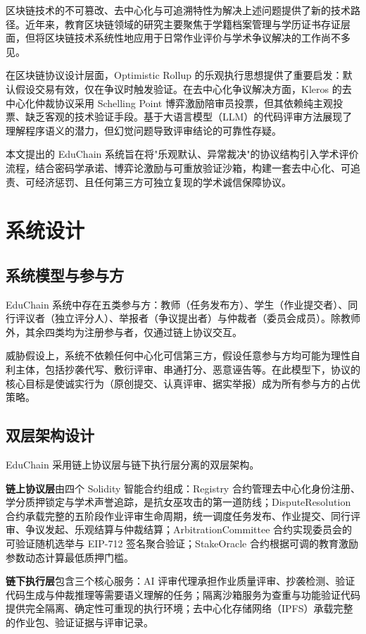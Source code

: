\documentclass[10pt,twocolumn]{ctexart}
\begin{document}
区块链技术的不可篡改、去中心化与可追溯特性为解决上述问题提供了新的技术路径。近年来，教育区块链领域的研究主要聚焦于学籍档案管理与学历证书存证层面，但将区块链技术系统性地应用于日常作业评价与学术争议解决的工作尚不多见。

在区块链协议设计层面，Optimistic Rollup 的乐观执行思想提供了重要启发：默认假设交易有效，仅在争议时触发验证。在去中心化争议解决方面，Kleros 的去中心化仲裁协议采用 Schelling Point 博弈激励陪审员投票，但其依赖纯主观投票、缺乏客观的技术验证手段。基于大语言模型（LLM）的代码评审方法展现了理解程序语义的潜力，但幻觉问题导致评审结论的可靠性存疑。

本文提出的 EduChain 系统旨在将"乐观默认、异常裁决"的协议结构引入学术评价流程，结合密码学承诺、博弈论激励与可重放验证沙箱，构建一套去中心化、可追责、可经济惩罚、且任何第三方可独立复现的学术诚信保障协议。

\section{系统设计}

\subsection{系统模型与参与方}

EduChain 系统中存在五类参与方：教师（任务发布方）、学生（作业提交者）、同行评议者（独立评分人）、举报者（争议提出者）与仲裁者（委员会成员）。除教师外，其余四类均为注册参与者，仅通过链上协议交互。

威胁假设上，系统不依赖任何中心化可信第三方，假设任意参与方均可能为理性自利主体，包括抄袭代写、敷衍评审、串通打分、恶意诬告等。在此模型下，协议的核心目标是使诚实行为（原创提交、认真评审、据实举报）成为所有参与方的占优策略。

\subsection{双层架构设计}

EduChain 采用链上协议层与链下执行层分离的双层架构。

\textbf{链上协议层}由四个 Solidity 智能合约组成：Registry 合约管理去中心化身份注册、学分质押锁定与学术声誉追踪，是抗女巫攻击的第一道防线；DisputeResolution 合约承载完整的五阶段作业评审生命周期，统一调度任务发布、作业提交、同行评审、争议发起、乐观结算与仲裁结算；ArbitrationCommittee 合约实现委员会的可验证随机选举与 EIP-712 签名聚合验证；StakeOracle 合约根据可调的教育激励参数动态计算最低质押门槛。

\textbf{链下执行层}包含三个核心服务：AI 评审代理承担作业质量评审、抄袭检测、验证代码生成与仲裁推理等需要语义理解的任务；隔离沙箱服务为查重与功能验证代码提供完全隔离、确定性可重现的执行环境；去中心化存储网络（IPFS）承载完整的作业包、验证证据与评审记录。
\end{document}
